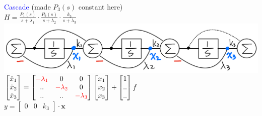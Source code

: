 \documentclass[4pt]{article}
\theoremstyle{definition}
\theoremstyle{definition}
\newcommand{\red}[1]{\textcolor{red}{#1}}
\newcommand{\blue}[1]{\textcolor{blue}{#1}}
\begin{document}
\begin{landscape}
\begin{multicols}{3}
\columnbreak
    \blue{Cascade} (made $P_3(s)$ constant here)\\
    \(H = \frac {P_1(s)}{s+\lambda_1} \cdot \frac{P_2(s)}{s+\lambda_2} \cdot \frac{k_3}{s+\lambda_3}\)\\
    \includegraphics[width=\linewidth]{figures/cascade.png}
    \(
    \begin{bmatrix}
        \dot{x}_1\\
        \dot{x}_2\\
        \dot{x}_3\\
    \end{bmatrix}
    =
    \begin{bmatrix}
        \red{-\lambda_1} & 0 & 0\\
        .. & \red{-\lambda_2} & 0\\
        .. & .. & \red{-\lambda_3}\\ 
    \end{bmatrix}
    \begin{bmatrix}
        x_1\\
        x_2\\
        x_3
    \end{bmatrix}
    +
    \begin{bmatrix}
        1\\..\\..         %
    \end{bmatrix}
    f
    \)\\

    \(y =
    \begin{bmatrix}
        0 & 0 & k_3       %
    \end{bmatrix}
    \cdot \mathbf x
    \)


\end{multicols}
\end{landscape}
\end{document}

